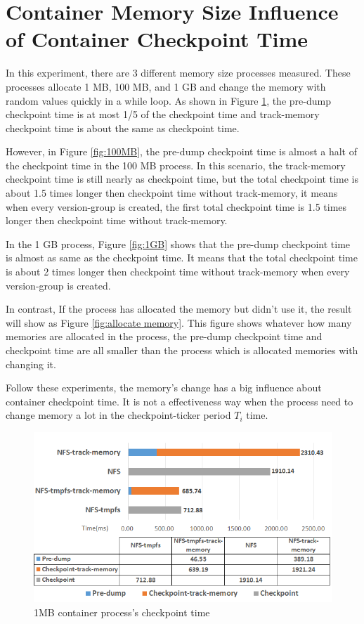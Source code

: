 \section{Container Memory Size Influence of Container Checkpoint Time}
\label{sec:Memory Size}
In this experiment, there are 3 different memory size processes measured. These processes allocate 1 MB, 100 MB, and 1 GB and change the memory with random values quickly in a while loop.
As shown in Figure \ref{fig:1MB}, the pre-dump checkpoint time is at most 1/5 of the checkpoint time and track-memory checkpoint time is about the same as checkpoint time.

However, in Figure \ref{fig:100MB}, the pre-dump checkpoint time is almost a halt of the checkpoint time in the 100 MB process.
In this scenario, the track-memory checkpoint time is still nearly as checkpoint time, but the total checkpoint time is about 1.5 times longer then checkpoint time without track-memory, it means when every version-group is created, the first total checkpoint time is 1.5 times longer then checkpoint time without track-memory.

In the 1 GB process, Figure \ref{fig:1GB} shows that the pre-dump checkpoint time is almost as same as the checkpoint time. It means that the total checkpoint time is about 2 times longer then checkpoint time without track-memory when every version-group is created. 

In contrast, If the process has allocated the memory but didn't use it, the result will show as Figure \ref{fig:allocate memory}. This figure shows whatever how many memories are allocated in the process, the pre-dump checkpoint time and checkpoint time are all smaller than the process which is allocated memories with changing it.

Follow these experiments, the memory's change has a big influence about container checkpoint time. It is not a effectiveness way when the process need to change memory a lot in the checkpoint-ticker period $ T_i $ time.

\begin{figure}[htbp]
\begin{center}
\includegraphics[width=14cm]{figure/1MB.png}
\end{center}
\caption{1MB container process's checkpoint time}
\label{fig:1MB}
\end{figure}

